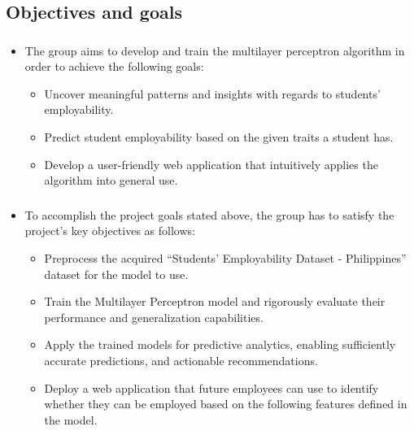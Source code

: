 \subsection{Objectives and goals}
\begin{frame}
\frametitle{\subsecname}
	\begin{itemize}
		\item The group aims to develop and train the multilayer perceptron algorithm in order to achieve the following goals:
			\begin{itemize}
				\item Uncover meaningful patterns and insights with regards to students' employability.
				\item Predict student employability based on the given traits a student has.
				\item Develop a user-friendly web application that intuitively applies the algorithm into general use.
			\end{itemize}
	\end{itemize}
\end{frame}

\begin{frame}
\frametitle{\subsecname}
	\begin{itemize}
		\item To accomplish the project goals stated above, the group has to satisfy the project's key objectives as follows:
			\begin{itemize}
				\item Preprocess the acquired ``Students' Employability Dataset - Philippines'' dataset for the model to use.
				\item Train the Multilayer Perceptron model and rigorously evaluate their performance and generalization capabilities.
				\item Apply the trained models for predictive analytics, enabling sufficiently accurate predictions, and actionable recommendations.
				\item Deploy a web application that future employees can use to identify whether they can be employed based on the following features defined in the model.
			\end{itemize}
	\end{itemize}
\end{frame}
